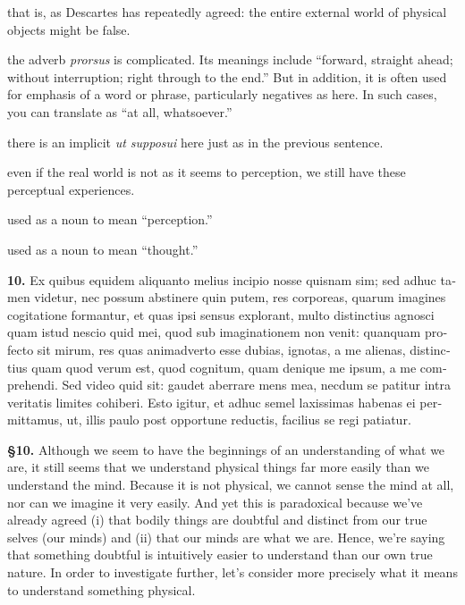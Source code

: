  that is, as Descartes has repeatedly agreed: the entire external world of physical objects might be false.

 the adverb \textit{prorsus} is complicated. Its meanings include ``forward, straight ahead; without interruption; right through to the end.'' But in addition, it is often used for emphasis of a word or phrase, particularly negatives as here. In such cases, you can translate as ``at all, whatsoever.''

 there is an implicit \textit{ut supposui} here just as in the previous sentence.

 even if the real world is not as it seems to perception, we still have these perceptual experiences.

 used as a noun to mean ``perception.''

 used as a noun to mean ``thought.''

\clearpage

\beginnumbering
\pstart
\begin{latin}
    \textenglish{\textbf{10.}} Ex quibus equidem aliquanto melius incipio nosse quisnam sim; sed adhuc tamen videtur, nec possum abstinere quin putem, res corporeas, quarum imagines cogitatione formantur, et quas ipsi sensus explorant, multo distinctius agnosci quam istud nescio quid mei, quod sub imaginationem non venit: quanquam profecto sit mirum, res quas animadverto esse dubias, ignotas, a me alienas, distinctius quam quod verum est, quod cognitum, quam denique me ipsum, a me comprehendi. Sed video quid sit: gaudet aberrare mens mea, necdum se patitur intra veritatis limites cohiberi. Esto igitur, et adhuc semel laxissimas habenas ei permittamus, ut, illis paulo post opportune reductis, facilius se regi patiatur.
\end{latin}
\pend
\endnumbering

\prenotes

\textbf{§10.} Although we seem to have the beginnings of an understanding of what we are, it still seems that we understand physical things far more easily than we understand the mind. Because it is not physical, we cannot sense the mind at all, nor can we imagine it very easily. And yet this is paradoxical because we've already agreed (i) that bodily things are doubtful and distinct from our true selves (our minds) and (ii) that our minds are what we are. Hence, we're saying that something doubtful is intuitively easier to understand than our own true nature. In order to investigate further, let's consider more precisely what it means to understand something physical.

